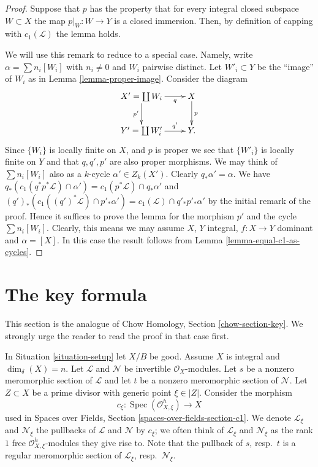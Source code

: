 \documentclass{stacks-project}
\theoremstyle{plain}
\theoremstyle{definition}
\theoremstyle{remark}
\numberwithin{equation}{subsection}
\def\Spec{\mathop{\mathrm{Spec}}}
\begin{document}
\begin{proof}
Suppose that $p$ has the property that for every integral
closed subspace $W \subset X$ the map $p|_W : W \to Y$
is a closed immersion. Then, by definition of capping
with $c_1(\mathcal{L})$ the lemma holds.

\medskip\noindent
We will use this remark to reduce to a special case. Namely,
write $\alpha = \sum n_i[W_i]$ with $n_i \not = 0$ and $W_i$ pairwise
distinct. Let $W'_i \subset Y$ be the ``image'' of $W_i$ as
in Lemma \ref{lemma-proper-image}. Consider the diagram
$$
\xymatrix{
X' = \coprod W_i \ar[r]_-q \ar[d]_{p'} & X \ar[d]^p \\
Y' = \coprod W'_i \ar[r]^-{q'} & Y.
}
$$
Since $\{W_i\}$ is locally finite on $X$, and $p$ is proper
we see that $\{W'_i\}$ is locally finite on $Y$ and that
$q, q', p'$ are also proper morphisms.
We may think of $\sum n_i[W_i]$ also as a $k$-cycle
$\alpha' \in Z_k(X')$. Clearly $q_*\alpha' = \alpha$.
We have
$q_*(c_1(q^*p^*\mathcal{L}) \cap \alpha')
= c_1(p^*\mathcal{L}) \cap q_*\alpha'$
and
$(q')_*(c_1((q')^*\mathcal{L}) \cap p'_*\alpha') =
c_1(\mathcal{L}) \cap q'_*p'_*\alpha'$ by the initial
remark of the proof. Hence it suffices to prove the lemma
for the morphism $p'$ and the cycle $\sum n_i[W_i]$.
Clearly, this means we may assume $X$, $Y$ integral,
$f : X \to Y$ dominant and $\alpha = [X]$.
In this case the result follows from
Lemma \ref{lemma-equal-c1-as-cycles}.
\end{proof}













\section{The key formula}
\label{section-key}

\noindent
This section is the analogue of Chow Homology, Section \ref{chow-section-key}.
We strongly urge the reader to read the proof in that case first.

\medskip\noindent
In Situation \ref{situation-setup} let $X/B$ be good. Assume $X$ is integral
and $\dim_\delta(X) = n$. Let $\mathcal{L}$ and $\mathcal{N}$ be invertible
$\mathcal{O}_X$-modules. Let $s$ be a nonzero meromorphic section of
$\mathcal{L}$ and let $t$ be a nonzero meromorphic section of $\mathcal{N}$.
Let $Z \subset X$ be a prime divisor with generic point $\xi \in |Z|$.
Consider the morphism
$$
c_\xi : \Spec(\mathcal{O}_{X, \xi}^h) \longrightarrow X
$$
used in Spaces over Fields, Section \ref{spaces-over-fields-section-c1}.
We denote $\mathcal{L}_\xi$ and $\mathcal{N}_\xi$ the pullbacks
of $\mathcal{L}$ and $\mathcal{N}$ by $c_\xi$; we often think of
$\mathcal{L}_\xi$ and $\mathcal{N}_\xi$ as the rank $1$ free
$\mathcal{O}_{X, \xi}^h$-modules they give rise to.
Note that the pullback of $s$, resp.\ $t$ is a regular meromorphic
section of $\mathcal{L}_\xi$, resp.\ $\mathcal{N}_\xi$.
\end{document}
